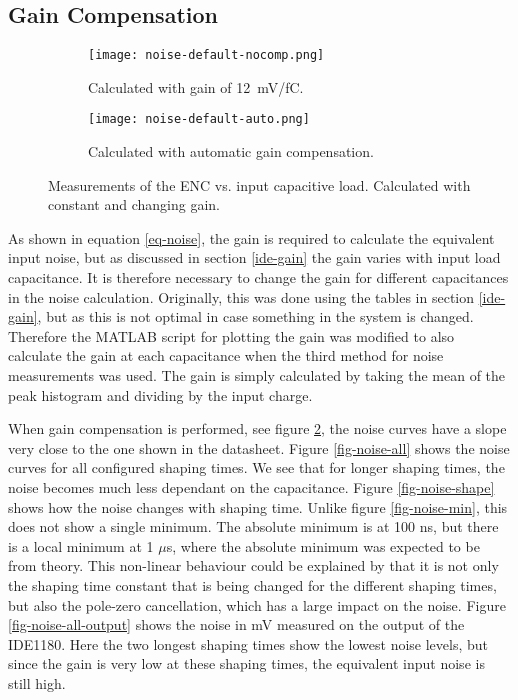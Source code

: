\documentclass[../main/thesis.tex]{subfiles}
\begin{document}
\subsection{Gain Compensation}
\label{ide-noise-gain}

\begin{figure} 
	\centering
	\begin{subfigure}{.5\textwidth}
		\centering
		\texttt{[image: noise-default-nocomp.png]}
		\caption{Calculated with gain of 12~mV/fC.}
		\label{fig-noise-nocomp}
	\end{subfigure}%
	\begin{subfigure}{.5\textwidth}%
		\centering
		\texttt{[image: noise-default-auto.png]}
		\caption{Calculated with automatic gain compensation.}
		\label{fig-noise-auto} 
	\end{subfigure}
	\caption{Measurements of the \gls{ENC} vs. input capacitive load. Calculated with constant and changing gain.}
	\label{fig-noise-nocomp-auto}
\end{figure}

As shown in equation \ref{eq-noise}, the gain is required to calculate the equivalent input noise, but as discussed in section \ref{ide-gain} the gain varies with input load capacitance. It is therefore necessary to change the gain for different capacitances in the noise calculation. Originally, this was done using the tables in section \ref{ide-gain}, but as this is not optimal in case something in the system is changed. Therefore the MATLAB script for plotting the gain was modified to also calculate the gain at each capacitance when the third method for noise measurements was used. The gain is simply calculated by taking the mean of the peak histogram and dividing by the input charge. 

When gain compensation is performed, see figure \ref{fig-noise-auto}, the noise curves have a slope very close to the one shown in the datasheet. Figure \ref{fig-noise-all} shows the noise curves for all configured shaping times. We see that for longer shaping times, the noise becomes much less dependant on the capacitance. Figure \ref{fig-noise-shape} shows how the noise changes with shaping time. Unlike figure \ref{fig-noise-min}, this does not show a single minimum. The absolute minimum is at 100 ns, but there is a local minimum at 1 $\mu$s, where the absolute minimum was expected to be from theory. This non-linear behaviour could be explained by that it is not only the shaping time constant that is being changed for the different shaping times, but also the pole-zero cancellation, which has a large impact on the noise. Figure \ref{fig-noise-all-output} shows the noise in mV measured on the output of the IDE1180. Here the two longest shaping times show the lowest noise levels, but since the gain is very low at these shaping times, the equivalent input noise is still high. 
\end{document}
